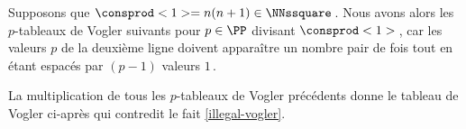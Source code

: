 \leavevmode
\smallskip

Supposons que $\consprod<1> = n(n+1) \in \NNssquare$\,. Nous avons alors les $p$-tableaux de Vogler suivants pour $p \in \PP$ divisant $\consprod<1>$\,, car les valeurs $p$ de la deuxième ligne doivent apparaître un nombre pair de fois tout en étant espacés par $(p-1)$ valeurs $1$\,. 

\begin{center}
\end{center}


La multiplication de tous les $p$-tableaux de Vogler précédents donne le tableau de Vogler ci-après qui contredit le fait \ref{illegal-vogler}.

\begin{center}
\end{center}